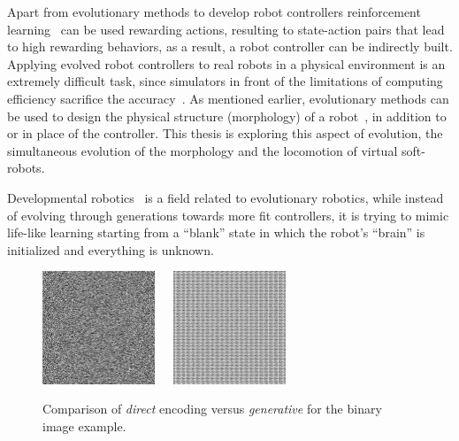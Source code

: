 Apart from evolutionary methods to develop robot controllers reinforcement learning~\citep{hayes1994robot,mahadevan1992automatic} can be used rewarding actions, resulting to state-action pairs that lead to high rewarding behaviors, as a result, a robot controller can be indirectly built. Applying evolved robot controllers to real robots in a physical environment is an extremely difficult task, since simulators in front of the limitations of computing efficiency sacrifice the accuracy~\citep{jakobi1995noise}. As mentioned earlier, evolutionary methods can be used to design the physical structure (morphology) of a robot~\citep{hiller2010evolving}, in addition to or in place of the controller. This thesis is exploring this aspect of evolution, the simultaneous evolution of the morphology and the locomotion of virtual soft-robots. 

Developmental robotics~\citep{lungarella2003developmental,asada2001cognitive,weng2004developmental,asada2009cognitive} is a field related to evolutionary robotics,  while instead of evolving through generations towards more fit controllers, it is trying to mimic life-like learning starting from a ``blank'' state in which the robot's ``brain'' is initialized and everything is unknown.

\begin{figure}[t!]
\centering
\includegraphics[width=0.3\textwidth]{../Figures/Misc/direct.jpg}\  \   \   
\includegraphics[width=0.3\textwidth]{../Figures/Misc/indirect.jpg}
\caption{Comparison of \emph{direct} encoding versus \emph{generative} for the binary image example.}
\label{fig:directVsIndirectEncoding}
\end{figure}


